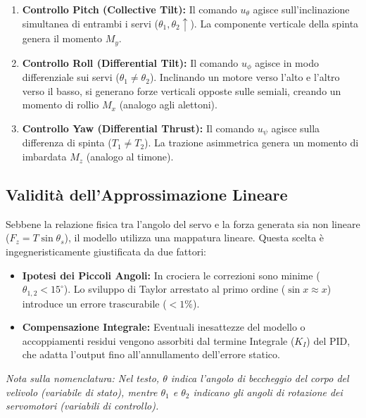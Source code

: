 \begin{enumerate}
    \item \textbf{Controllo Pitch (Collective Tilt):}
    Il comando $u_\theta$ agisce sull'inclinazione simultanea di entrambi i servi ($\theta_1, \theta_2 \uparrow$). La componente verticale della spinta genera il momento $M_y$.
    
    \item \textbf{Controllo Roll (Differential Tilt):}
    Il comando $u_\phi$ agisce in modo differenziale sui servi ($\theta_1 \neq \theta_2$). Inclinando un motore verso l'alto e l'altro verso il basso, si generano forze verticali opposte sulle semiali, creando un momento di rollio $M_x$ (analogo agli alettoni).
    
    \item \textbf{Controllo Yaw (Differential Thrust):}
    Il comando $u_\psi$ agisce sulla differenza di spinta ($T_1 \neq T_2$). La trazione asimmetrica genera un momento di imbardata $M_z$ (analogo al timone).
\end{enumerate}

\subsection{Validità dell'Approssimazione Lineare}
Sebbene la relazione fisica tra l'angolo del servo e la forza generata sia non lineare ($F_z = T \sin \theta_s$), il modello utilizza una mappatura lineare. Questa scelta è ingegneristicamente giustificata da due fattori:

\begin{itemize}
    \item \textbf{Ipotesi dei Piccoli Angoli:} In crociera le correzioni sono minime ($\theta_{1,2} < 15^\circ$). Lo sviluppo di Taylor arrestato al primo ordine ($\sin x \approx x$) introduce un errore trascurabile ($< 1\%$).
    \item \textbf{Compensazione Integrale:} Eventuali inesattezze del modello o accoppiamenti residui vengono assorbiti dal termine Integrale ($K_I$) del PID, che adatta l'output fino all'annullamento dell'errore statico.
\end{itemize}
\vspace{0.5cm}
\small{\textit{Nota sulla nomenclatura: Nel testo, $\theta$ indica l'angolo di beccheggio del corpo del velivolo (variabile di stato), mentre $\theta_1$ e $\theta_2$ indicano gli angoli di rotazione dei servomotori (variabili di controllo).}}
\clearpage

